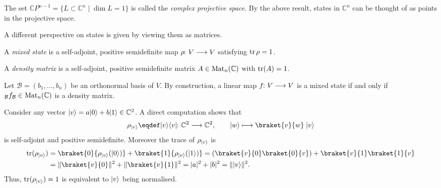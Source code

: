 \documentclass[a4paper, oneside, 12pt]{amsart}
\begin{document}
The set \( \mathbb{C}P^{n-1} =\{L \subset \mathbb{C}^{n}\mid \dim L = 1\} \) is called the \emph{complex projective space}.
By the above result, states in \( \mathbb{C}^{n}\) can be thought of as points in the projective space.
\bigskip

A different perspective on states is given by viewing them as matrices.

\begin{definition}\label{def:mixed-state-density-matrix}
  A \emph{mixed state} is a self-adjoint, positive semidefinite map \(\rho\from V\to V\) satisfying \(\operatorname{tr} \rho = 1\).

  A \emph{density matrix} is a self-adjoint, positive semidefinite matrix \(A \in \operatorname{Mat}_{n}( \mathbb{C})\) with \(\operatorname{tr}(A)=1\).
\end{definition}

\begin{remark}\label{rmk:density-matrices-are-mixed-states}
  Let \(\mathcal{B}=(b_{1}, \dots , b_{n})\) be an orthonormal basis of \(V\).
  By construction, a linear map \(f\from V\to V\) is a mixed state if and only if \(_{\mathcal{B}}f_{\mathcal{B}} \in \operatorname{Mat}_{n}(\mathbb{C})\) is a density matrix.
\end{remark}


Consider any  vector \(\lvert v\rangle= a \lvert0\rangle + b \lvert1\rangle \in \mathbb{C}^{2}\).
A direct computation shows that
\begin{equation*}
  \rho_{\ket v}\eqdef\ket{v}\bra{v} \from \mathbb{C}^{2} \to \mathbb{C}^{2}, \qquad \ket{w} \mapsto \braket{v}{w}\; \ket{v}
\end{equation*}
is self-adjoint and positive semidefinite.
Moreover the trace of \(\rho_{\lvert v\rangle}\) is
\begin{align*}
  \tr(\rho_{\ket v})
  & = \braket{0}{\rho_{\ket v}(\ket 0)} + \braket{1}{\rho_{\ket v}(\ket{1})}
    = (\braket{v}{0}\braket{0}{v}) + \braket{v}{1}\braket{1}{v} \\
  & = \|\braket{v}{0}\|^{2} + \|\braket{v}{1}\|^{2}
    = |a|^{2} + |b|^{2} = \|\ket{v}\|^{2}.
\end{align*}
Thus, \(\operatorname{tr}(\rho_{\lvert v\rangle})=1\) is equivalent to \(\lvert v\rangle\) being normalised.
\end{document}
